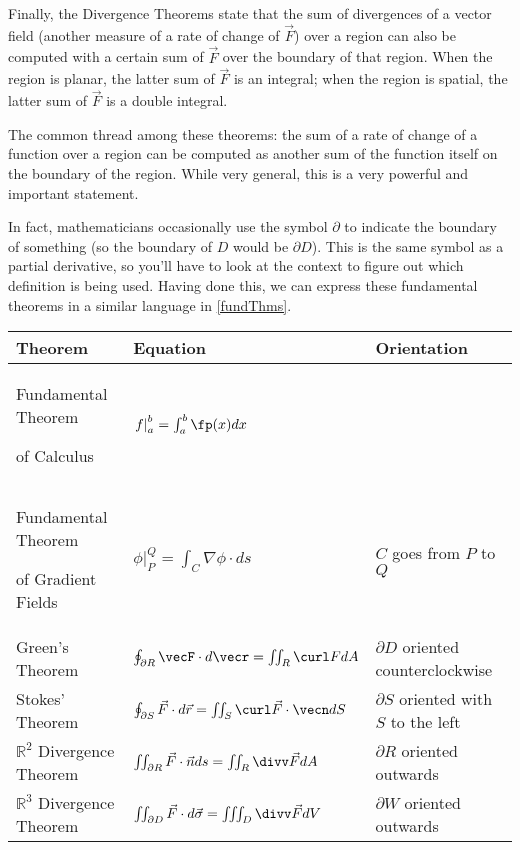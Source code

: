 Finally, the Divergence Theorems state that the sum of divergences of a vector field (another measure of a rate of change of $\vec F$) over a region can also be computed with a certain sum of $\vec F$ over the boundary of that region. When the region is planar, the latter sum of $\vec F$ is an integral; when the region is spatial, the latter sum of $\vec F$ is a double integral.

The common thread among these theorems: the sum of a rate of change of a function over a region can be computed as another sum of the function itself on the boundary of the region. While very general, this is a very powerful and important statement.


In fact, mathematicians occasionally use the symbol $\partial$ to indicate the boundary of something (so the boundary of $D$ would be $\partial D$).  This is the same symbol as a partial derivative, so you'll have to look at the context to figure out which definition is being used.  Having done this, we can express these fundamental theorems in a similar language in \autoref{fundThms}.


{
\begin{keyidea}\label{fundThms}
\renewcommand{\arraystretch}{1.4}
 \begin{tabular}{p{.25\linewidth} l p{.35\linewidth}}
  Theorem & Equation & Orientation \\\midrule
  Fundamental Theorem\par of Calculus & $\left.f\right|_a^b=\int_a^b \fp(x)d x$ &\\
  Fundamental Theorem\par of Gradient Fields & $\left.\phi\right|_P^Q=\int_C\nabla\phi\cdot d s$ & $C$ goes from $P$ to $Q$ \\
  Green's Theorem & $\oint_{\partial R}\vecF\cdot d\vecr=\iint_R\curl F d A$ & $\partial D$ oriented counterclockwise \\
  Stokes' Theorem & $\oint_{\partial S}\vec F\cdot d\vec r=\iint_S\curl\vec F\cdot \vecn dS$ & $\partial S$ oriented with $S$ to the left \\
  $\mathbb{R}^2$ Divergence Theorem & $\iint_{\partial R}\vec F\cdot\vec n d s=\iint_R\divv\vec Fd A$ & $\partial R$ oriented outwards \\
  $\mathbb{R}^3$ Divergence Theorem & $\iint_{\partial D}\vec F\cdot d \vec\sigma=\iiint_D\divv\vec Fd V$ & $\partial W$ oriented outwards
 \end{tabular}
\end{keyidea}
}

